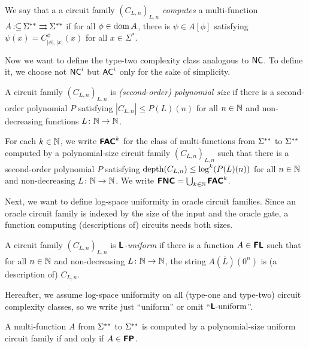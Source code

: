\documentclass[envcountsame,orivec,oribibl]{llncs}
\newcommand{\pcolon}{\mathpunct{\,:\subseteq}}
\begin{document}
\begin{definition}
 We say that a a circuit family $(C_{L,n})_{L,n}$ 
\emph{computes} a multi-function 
 $A \pcolon \LM \rightrightarrows \LM$ if for all $\phi \in \mathop{\rm dom} A$, 
 there is $\psi \in A[\phi]$ satisfying $\psi(x) = C_{|\phi|, |x|}^\phi(x)$
 for all $x \in \Sigma^*$.
\end{definition}

Now we want to define the type-two complexity class analogous to $\mathsf{NC}$.
To define it, we choose not $\mathsf{NC}^i$ but $\mathsf{AC}^i$ 
only for the sake of simplicity.

A circuit family $(C_{L,n})_{L,n}$ is \emph{(second-order) polynomial size}
if there is a second-order polynomial $P$ satisfying
$|C_{L,n}| \le P(L)(n)$ for all $n \in \mathbb N$ and non-decreasing functions
$L \colon \mathbb N \to \mathbb N$.

\begin{definition}
 For each $k \in \mathbb N$, 
 we write $\text{\bfseries \sffamily \upshape FAC}^k$ for the class of 
 multi-functions from $\Sigma ^{**}$ to $\Sigma ^{**}$ computed by
 a polynomial-size circuit family $(C_{L,n})_{L,n}$ such that
 there is a second-order polynomial $P$ satisfying
 $\mathop{\rm depth}(C_{L,n}) \le \log^k(P(L)(n))$ 
 for all $n \in \mathbb N$ and non-decreasing
 $L \colon \mathbb N \to \mathbb N$.
 We write $\text{\bfseries \sffamily \upshape FNC} = \bigcup_{k \in \mathbb N} \text{\bfseries \sffamily \upshape FAC}^k$.
\end{definition}

Next, we want to define log-space uniformity in oracle circuit families.
Since an oracle circuit family is indexed by the size of the input and the oracle gate,
a function computing (descriptions of) circuits needs both sizes.

\begin{definition}[uniformity]
A circuit family $(C_{L,n})_{L,n}$ is \emph{$\text{\bfseries \sffamily \upshape L}$-uniform} if there is a function $A \in \text{\bfseries \sffamily \upshape FL}$ 
such that for all $n \in \mathbb N$ and non-decreasing $L \colon \mathbb N \to \mathbb N$, 
the string $A (\overline L) (0^n)$ is (a description of) $C_{L,n}$. 
\end{definition}

Hereafter, we assume log-space uniformity on all (type-one and type-two) 
circuit complexity classes, so we write just ``uniform'' or omit ``$\text{\bfseries \sffamily \upshape L}\text{-uniform}$''.

\begin{theorem}
\label{theorem:P-equals-L-uniform-P-poly}
A multi-function $A$ from $\Sigma ^{**}$ to $\Sigma ^{**}$ is computed by a polynomial-size
uniform circuit family if and only if $A \in \text{\bfseries \sffamily \upshape FP}$.
\end{theorem}
\end{document}
